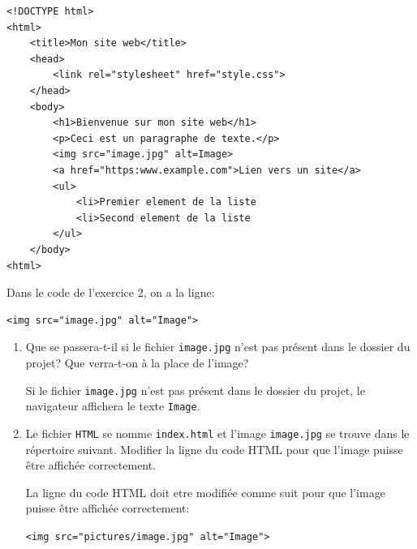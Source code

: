 \documentclass[11pt, a4paper, tikz,border=10pt]{report}
\def\ptsexoC{2}
\begin{document}
    \begin{lstlisting}[numbers=none]
<!DOCTYPE html>
<html>
    <title>Mon site web</title>
    <head>
        <link rel="stylesheet" href="style.css">
    </head>
    <body>
        <h1>Bienvenue sur mon site web</h1>
        <p>Ceci est un paragraphe de texte.</p>
        <img src="image.jpg" alt=Image>
        <a href="https:www.example.com">Lien vers un site</a>
        <ul>
            <li>Premier element de la liste
            <li>Second element de la liste
        </ul>
    </body>
<html>
    \end{lstlisting}

\pagebreak

 \exods{\ptsexoC}

        Dans le code de l'exercice 2, on a la ligne:

        \begin{lstlisting}[numbers=none]
<img src="image.jpg" alt="Image">
        \end{lstlisting}

        \begin{enumerate}
            \item         Que se passera-t-il si le fichier \texttt{image.jpg} n'est pas présent dans le dossier du projet? Que verra-t-on à la place de l'image?
        \begin{blocvisible}[height=1.5]
            Si le fichier \texttt{image.jpg} n'est pas présent dans le dossier du projet, le navigateur affichera le texte \verb|Image|.
        \end{blocvisible}

        \medskip

        \item Le fichier \verb|HTML| se nomme \verb|index.html| et l'image \verb|image.jpg| se trouve dans le répertoire suivant. Modifier la ligne du code HTML pour que l'image puisse être affichée correctement.
\medskip

\begin{minipage}{0.2\linewidth}
\end{minipage}\hfill{}
\begin{minipage}{0.78\linewidth}
   \begin{blocvisible}[height=2.5]
        La ligne du code HTML doit etre modifiée comme suit pour que l'image puisse être affichée correctement:

        \verb|<img src="pictures/image.jpg" alt="Image">|
   \end{blocvisible}
\end{minipage}


    \end{enumerate}
\end{document}
